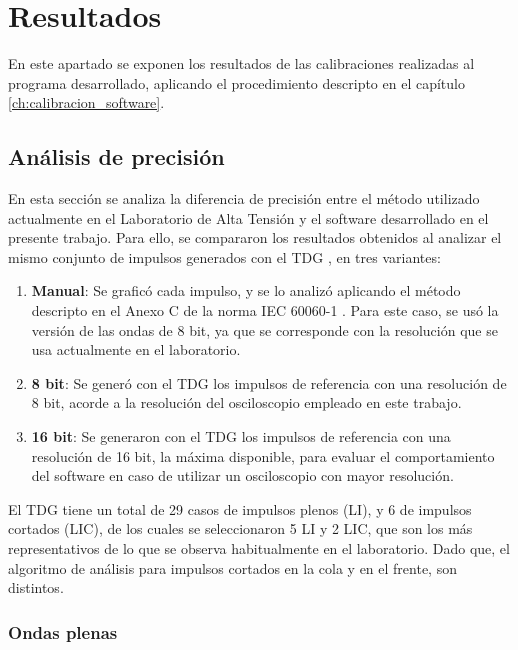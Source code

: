 \newpage
\chapter*{Resultados}
\label{ch:resultados}
\vspace{3\baselineskip}

En este apartado se exponen los resultados de las calibraciones realizadas al programa desarrollado, aplicando el procedimiento descripto en el capítulo \ref{ch:calibracion_software}.

\section{Análisis de precisión}
\label{sec:analisis_precision}

En esta sección se analiza la diferencia de precisión entre el método utilizado actualmente en el Laboratorio de Alta Tensión y el software desarrollado en el presente trabajo. Para ello, se compararon los resultados obtenidos al analizar el mismo conjunto de impulsos generados con el TDG \cite{iec61083_2}, en tres variantes:

\begin{enumerate}
    \item \textbf{Manual}: Se graficó cada impulso, y se lo analizó aplicando el método descripto en el Anexo C de la norma IEC 60060-1 \cite{iec60060_1}. Para este caso, se usó la versión de las ondas de 8 bit, ya que se corresponde con la resolución que se usa actualmente en el laboratorio.
    \item \textbf{8 bit}: Se generó con el TDG los impulsos de referencia con una resolución de \num{8} bit, acorde a la resolución del osciloscopio \cite{gds1000au_UserManual} empleado en este trabajo.
    \item \textbf{16 bit}: Se generaron con el TDG los impulsos de referencia con una resolución de \num{16} bit, la máxima disponible, para evaluar el comportamiento del software en caso de utilizar un osciloscopio con mayor resolución.
\end{enumerate}

El TDG tiene un total de \num{29} casos de impulsos plenos (LI), y \num{6} de impulsos cortados (LIC), de los cuales se seleccionaron \num{5} LI y \num{2} LIC, que son los más representativos de lo que se observa habitualmente en el laboratorio. Dado que, el algoritmo de análisis para impulsos cortados en la cola y en el frente, son distintos.

\subsection{Ondas plenas}
\label{subsec:precision_onda_plena}

